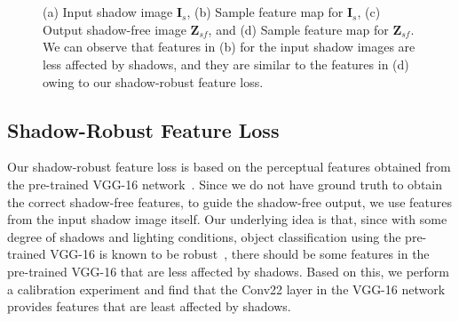 \documentclass[10pt,twocolumn,letterpaper]{article}
\begin{document}
\begin{figure}[t]
	\centering
\captionsetup[subfloat]{farskip=2pt}
	\hfill
	\hfill
	\hfill
	\hfill\\
	\vspace{-0.01in}
	\setcounter{subfigure}{0}
	\hfill
	\hfill
	\hfill
	\hfill\\
	\vspace{-0.01in}
	\caption{(a) Input shadow image $\mathbf{I}_{s}$, (b) Sample feature map for $\mathbf{I}_{s}$, (c) Output shadow-free image $\mathbf{Z}_{sf}$, and (d) Sample feature map for $\mathbf{Z}_{sf}$. We can observe that features in (b) for the input shadow images are less affected by shadows, and they are similar to the features in (d) owing to our shadow-robust feature loss.}
\label{fig:featureloss}
\end{figure}
\subsection{Shadow-Robust Feature Loss}
Our shadow-robust feature loss is based on the perceptual features obtained from the pre-trained VGG-16 network~\cite{Johnson16, sharma2020nighttime}. 
Since we do not have ground truth to obtain the correct shadow-free features, to guide the shadow-free output, we use features from the input shadow image itself. 
Our underlying idea is that, since with some degree of shadows and lighting conditions, object classification using the pre-trained VGG-16 is known to be robust~\cite{webster2018psyphy}, there should be some features in the pre-trained VGG-16 that are less affected by shadows. Based on this, we perform a calibration experiment and find that the Conv22 layer in the VGG-16 network provides features that are least affected by shadows. 
\end{document}
